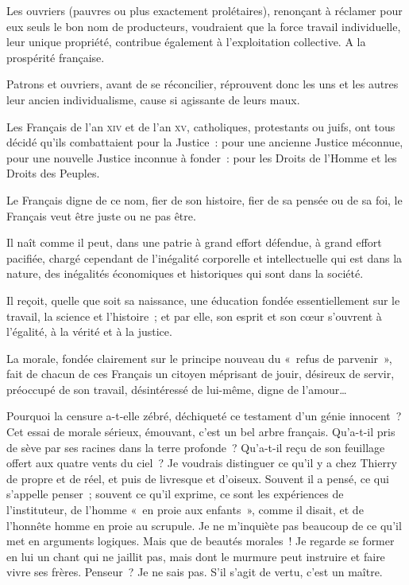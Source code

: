 \documentclass[french,twoside]{book} %
\newenvironment{quoteblock}%
  {\begin{quoting}}
  {\end{quoting}}
\newenvironment{quotebar}{%
    \def\FrameCommand{{\color{rubric!10!}\vrule width 0.5em} \hspace{0.9em}}%
    \def\OuterFrameSep{\itemsep} %
    \MakeFramed {\advance\hsize-\width \FrameRestore}
  }%
  {%
    \endMakeFramed
  }
\renewenvironment{quoteblock}%
  {%
    \savenotes
    \setstretch{0.9}
    \normalfont
    \begin{quotebar}
  }
  {%
    \end{quotebar}
    \spewnotes
  }
\begin{document}
\begin{quoteblock}
 \noindent Les ouvriers (pauvres ou plus exactement prolétaires), renonçant à réclamer pour eux seuls le bon nom de producteurs, voudraient que la force travail individuelle, leur unique propriété, contribue également à l’exploitation collective. A la prospérité française.‌\par
 Patrons et ouvriers, avant de se réconcilier, réprouvent donc les uns et les autres leur ancien individualisme, cause si agissante de leurs maux.‌\par
 Les Français de l’an \textsc{xiv} et de l’an \textsc{xv}, catholiques, protestants ou juifs, ont tous décidé qu’ils combattaient pour la Justice : pour une ancienne Justice méconnue, pour une nouvelle Justice inconnue à fonder : pour les Droits de l’Homme et les Droits des Peuples.‌\par
 Le Français digne de ce nom, fier de son histoire, fier de sa pensée ou de sa foi, le Français veut être juste ou ne pas être.‌\par
 Il naît comme il peut, dans une patrie à grand effort défendue, à grand effort pacifiée, chargé cependant de l’inégalité corporelle et intellectuelle qui est dans la nature, des inégalités économiques et historiques qui sont dans la société.‌\par
 Il reçoit, quelle que soit sa naissance, une éducation fondée essentiellement sur le travail, la science et l’histoire ; et par elle, son esprit et son cœur s’ouvrent à l’égalité, à la vérité et à la justice.‌\par
 La morale, fondée clairement sur le principe nouveau du « refus de parvenir », fait de chacun de ces Français un citoyen méprisant de jouir, désireux de servir, préoccupé de son travail, désintéressé de lui-même, digne de l’amour…‌
 \end{quoteblock}

\noindent Pourquoi la censure a-t-elle zébré, déchiqueté ce testament d’un génie innocent ? Cet essai de morale sérieux, émouvant, c’est un bel arbre français. Qu’a-t-il pris de sève par ses racines dans la terre profonde ? Qu’a-t-il reçu de son feuillage offert aux quatre vents du ciel ? Je voudrais distinguer ce qu’il y a chez Thierry de propre et de réel, et puis de livresque et d’oiseux. Souvent il a pensé, ce qui s’appelle penser ; souvent ce qu’il exprime, ce sont les expériences de l’instituteur, de l’homme « en proie aux enfants », comme il disait, et de l’honnête homme en proie au scrupule. Je ne m’inquiète pas beaucoup de ce qu’il met en arguments logiques. Mais que de beautés morales ! Je regarde se former en lui un chant qui ne jaillit pas, mais dont le murmure peut instruire et faire vivre ses frères. Penseur ? Je ne sais pas. S’il s’agit de vertu, c’est un maître.\par
\end{document}
